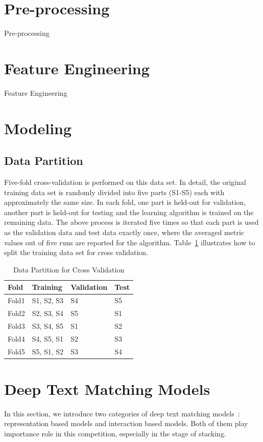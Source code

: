 \documentclass[12pt]{article}
\begin{document}
\section{Pre-processing}


Pre-processing

\section{Feature Engineering}

Feature Engineering  

\section{Modeling}

\subsection{Data Partition}

Five-fold cross-validation is performed on this data set. In detail, the original training data set is randomly divided into five parts (S1-S5) each with approximately the same size. In each fold, one part is held-out for validation, another part is held-out for testing and the learning algorithm is trained on the remaining data. The above process is iterated five times so that each part is used as the validation data and test data exactly once, where the averaged metric values out of five runs are reported for the algorithm. Table~{\ref{tab:data-part-cv}} illustrates how to split the training data set for cross validation.

\begin{table}[ht]
\centering
\caption{Data Partition for Cross Validation}
    \label{tab:data-part-cv}
\begin{tabular}{p{3cm}p{3cm}p{3cm}p{3cm}}
\hline
 Fold & Training	& Validation        & Test \\
\hline\hline
Fold1 & S1, S2, S3 & S4 & S5 \\ \hline
Fold2	&	S2, S3, S4	&	S5	&		S1 \\ \hline	
Fold3	&	S3, S4, S5	&	S1	&		S2	\\ \hline
Fold4	&	S4, S5, S1	&	S2	&		S3	\\ \hline
Fold5	&	S5, S1, S2	&	S3	&		S4 \\ \hline
\end{tabular}
\end{table}

\section{Deep Text Matching Models}
In this section, we introduce two categories of deep text matching models~\cite{}: representation based models and interaction based models. Both of them play importance role in this competition, especially in the stage of stacking.
\end{document}
